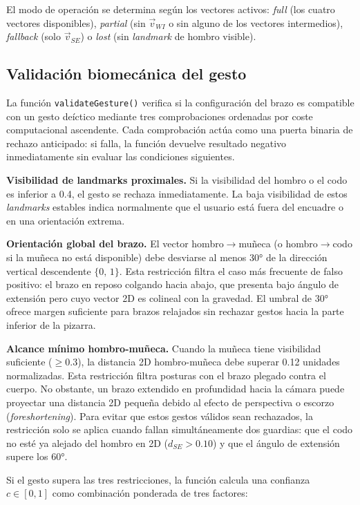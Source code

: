 \documentclass[12pt]{report} %
\begin{document}
El modo de operación se determina según los vectores activos: \textit{full} (los cuatro vectores disponibles), \textit{partial} (sin $\vec{v}_{WI}$ o sin alguno de los vectores intermedios), \textit{fallback} (solo $\vec{v}_{SE}$) o \textit{lost} (sin \textit{landmark} de hombro visible).

\subsection{Validación biomecánica del gesto}
\label{sec:validacion}

La función \texttt{validateGesture()} verifica si la configuración del brazo es compatible con un gesto deíctico mediante tres comprobaciones ordenadas por coste computacional ascendente. Cada comprobación actúa como una puerta binaria de rechazo anticipado: si falla, la función devuelve resultado negativo inmediatamente sin evaluar las condiciones siguientes.

\textbf{Visibilidad de landmarks proximales.} Si la visibilidad del hombro o el codo es inferior a 0.4, el gesto se rechaza inmediatamente. La baja visibilidad de estos \textit{landmarks} estables indica normalmente que el usuario está fuera del encuadre o en una orientación extrema.

\textbf{Orientación global del brazo.} El vector hombro$\rightarrow$muñeca (o hombro$\rightarrow$codo si la muñeca no está disponible) debe desviarse al menos 30° de la dirección vertical descendente $\{0,\,1\}$. Esta restricción filtra el caso más frecuente de falso positivo: el brazo en reposo colgando hacia abajo, que presenta bajo ángulo de extensión pero cuyo vector 2D es colineal con la gravedad. El umbral de 30° ofrece margen suficiente para brazos relajados sin rechazar gestos hacia la parte inferior de la pizarra.

\textbf{Alcance mínimo hombro-muñeca.} Cuando la muñeca tiene visibilidad suficiente ($\geq 0.3$), la distancia 2D hombro-muñeca debe superar 0.12 unidades normalizadas. Esta restricción filtra posturas con el brazo plegado contra el cuerpo. No obstante, un brazo extendido en profundidad hacia la cámara puede proyectar una distancia 2D pequeña debido al efecto de perspectiva o escorzo (\textit{foreshortening}). Para evitar que estos gestos válidos sean rechazados, la restricción solo se aplica cuando fallan simultáneamente dos guardias: que el codo no esté ya alejado del hombro en 2D ($d_{SE} > 0.10$) y que el ángulo de extensión supere los 60°.

Si el gesto supera las tres restricciones, la función calcula una confianza $c \in [0,1]$ como combinación ponderada de tres factores:
\end{document}
